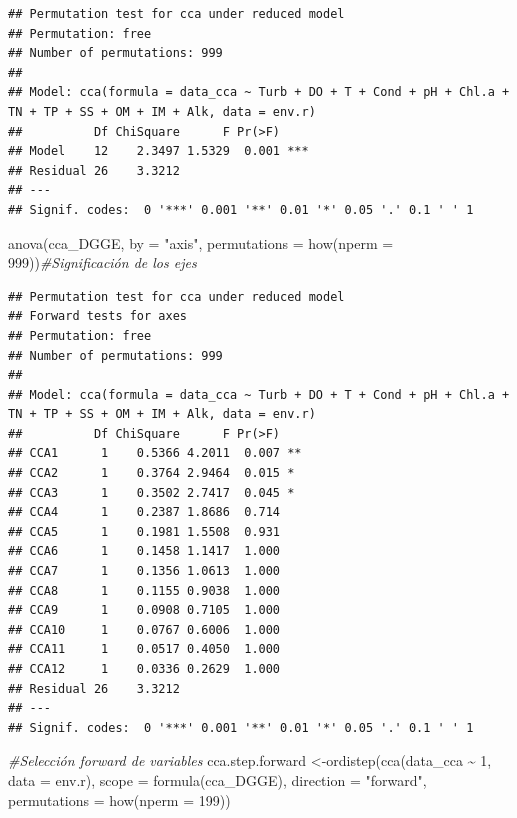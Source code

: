 \documentclass[
]{book}
\newenvironment{Shaded}{\begin{snugshade}}{\end{snugshade}}
\newcommand{\AttributeTok}[1]{\textcolor[rgb]{0.77,0.63,0.00}{#1}}
\newcommand{\CommentTok}[1]{\textcolor[rgb]{0.56,0.35,0.01}{\textit{#1}}}
\newcommand{\DecValTok}[1]{\textcolor[rgb]{0.00,0.00,0.81}{#1}}
\newcommand{\FunctionTok}[1]{\textcolor[rgb]{0.00,0.00,0.00}{#1}}
\newcommand{\NormalTok}[1]{#1}
\newcommand{\OtherTok}[1]{\textcolor[rgb]{0.56,0.35,0.01}{#1}}
\newcommand{\SpecialCharTok}[1]{\textcolor[rgb]{0.00,0.00,0.00}{#1}}
\newcommand{\StringTok}[1]{\textcolor[rgb]{0.31,0.60,0.02}{#1}}
\begin{document}
\begin{verbatim}
## Permutation test for cca under reduced model
## Permutation: free
## Number of permutations: 999
## 
## Model: cca(formula = data_cca ~ Turb + DO + T + Cond + pH + Chl.a + TN + TP + SS + OM + IM + Alk, data = env.r)
##          Df ChiSquare      F Pr(>F)    
## Model    12    2.3497 1.5329  0.001 ***
## Residual 26    3.3212                  
## ---
## Signif. codes:  0 '***' 0.001 '**' 0.01 '*' 0.05 '.' 0.1 ' ' 1
\end{verbatim}

\begin{Shaded}
\begin{Highlighting}[]
\FunctionTok{anova}\NormalTok{(cca\_DGGE, }\AttributeTok{by =} \StringTok{"axis"}\NormalTok{, }\AttributeTok{permutations =} \FunctionTok{how}\NormalTok{(}\AttributeTok{nperm =} \DecValTok{999}\NormalTok{))}\CommentTok{\#Significación de los ejes}
\end{Highlighting}
\end{Shaded}

\begin{verbatim}
## Permutation test for cca under reduced model
## Forward tests for axes
## Permutation: free
## Number of permutations: 999
## 
## Model: cca(formula = data_cca ~ Turb + DO + T + Cond + pH + Chl.a + TN + TP + SS + OM + IM + Alk, data = env.r)
##          Df ChiSquare      F Pr(>F)   
## CCA1      1    0.5366 4.2011  0.007 **
## CCA2      1    0.3764 2.9464  0.015 * 
## CCA3      1    0.3502 2.7417  0.045 * 
## CCA4      1    0.2387 1.8686  0.714   
## CCA5      1    0.1981 1.5508  0.931   
## CCA6      1    0.1458 1.1417  1.000   
## CCA7      1    0.1356 1.0613  1.000   
## CCA8      1    0.1155 0.9038  1.000   
## CCA9      1    0.0908 0.7105  1.000   
## CCA10     1    0.0767 0.6006  1.000   
## CCA11     1    0.0517 0.4050  1.000   
## CCA12     1    0.0336 0.2629  1.000   
## Residual 26    3.3212                 
## ---
## Signif. codes:  0 '***' 0.001 '**' 0.01 '*' 0.05 '.' 0.1 ' ' 1
\end{verbatim}

\begin{Shaded}
\begin{Highlighting}[]
\CommentTok{\#Selección forward de variables}
\NormalTok{cca.step.forward }\OtherTok{\textless{}{-}}\FunctionTok{ordistep}\NormalTok{(}\FunctionTok{cca}\NormalTok{(data\_cca }\SpecialCharTok{\textasciitilde{}} \DecValTok{1}\NormalTok{, }\AttributeTok{data =}\NormalTok{ env.r), }\AttributeTok{scope =} \FunctionTok{formula}\NormalTok{(cca\_DGGE),}
\AttributeTok{direction =} \StringTok{"forward"}\NormalTok{, }\AttributeTok{permutations =} \FunctionTok{how}\NormalTok{(}\AttributeTok{nperm =} \DecValTok{199}\NormalTok{))}
\end{Highlighting}
\end{Shaded}
\end{document}
